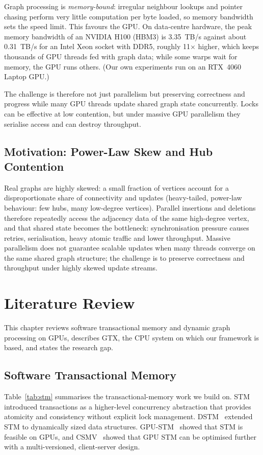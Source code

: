 \documentclass[11pt,a4paper,oneside]{report}
\begin{document}
Graph processing is \emph{memory-bound}: irregular neighbour lookups and pointer chasing perform very little
computation per byte loaded, so memory bandwidth sets the speed limit. This favours the GPU. On data-centre hardware,
the peak memory bandwidth of an NVIDIA H100 (HBM3) is 3.35~TB/s against about 0.31~TB/s for an Intel Xeon socket with
DDR5, roughly 11$\times$ higher, which keeps thousands of GPU threads fed with graph data; while some warps wait for
memory, the GPU runs others. (Our own experiments run on an RTX~4060 Laptop GPU.)

The challenge is therefore not just parallelism but preserving correctness and progress while many GPU threads update
shared graph state concurrently. Locks can be effective at low contention, but under massive GPU parallelism they
serialise access and can destroy throughput.

\section{Motivation: Power-Law Skew and Hub Contention}
Real graphs are highly skewed: a small fraction of vertices account for a disproportionate share of connectivity and
updates (heavy-tailed, power-law behaviour: few hubs, many low-degree vertices). Parallel insertions and deletions
therefore repeatedly access the adjacency data of the same high-degree vertex, and that shared state becomes the
bottleneck: synchronisation pressure causes retries, serialisation, heavy atomic traffic and lower throughput. Massive
parallelism does not guarantee scalable updates when many threads converge on the same shared graph structure; the
challenge is to preserve correctness and throughput under highly skewed update streams.

\chapter{Literature Review}
\label{ch:lit}
This chapter reviews software transactional memory and dynamic graph processing on GPUs, describes GTX, the CPU system
on which our framework is based, and states the research gap.

\section{Software Transactional Memory}
Table~\ref{tab:stm} summarises the transactional-memory work we build on. STM~\cite{stm} introduced transactions as a
higher-level concurrency abstraction that provides atomicity and consistency without explicit lock management.
DSTM~\cite{dstm} extended STM to dynamically sized data structures. GPU-STM~\cite{gpustm} showed that STM is feasible
on GPUs, and CSMV~\cite{csmv} showed that GPU STM can be optimised further with a multi-versioned, client-server design.
\end{document}
